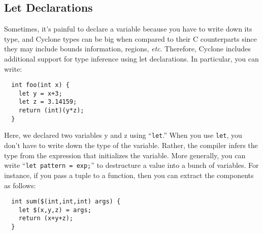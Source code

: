 
\subsection{Let Declarations}

Sometimes, it's painful to declare a variable because you have to
write down its type, and Cyclone types can be big when compared
to their C counterparts since they may include bounds information,
regions, \emph{etc}.  Therefore, Cyclone includes additional support for type
inference using let declarations.  In particular, you can write:
\begin{verbatim}
  int foo(int x) {
    let y = x+3;
    let z = 3.14159;
    return (int)(y*z);
  }
\end{verbatim}

Here, we declared two variables y and z using ``\texttt{let}.''  When
you use \texttt{let}, you don't have to write down the type of the
variable.  Rather, the compiler infers the type from the expression
that initializes the variable.  More generally, you can write
``\texttt{let pattern = exp;}'' to destructure a value into a bunch of
variables.  For instance, if you pass a tuple to a function, then you
can extract the components as follows:
\begin{verbatim}
  int sum($(int,int,int) args) {
    let $(x,y,z) = args;
    return (x+y+z);
  }
\end{verbatim}

